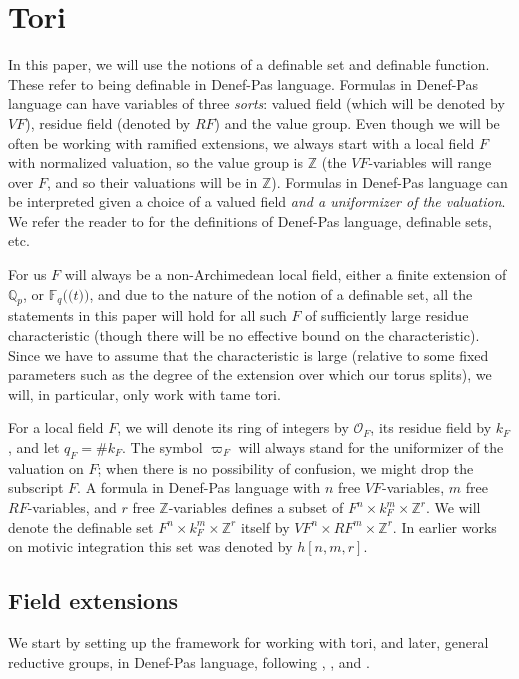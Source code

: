\documentclass{amsart}
\newcommand{\Q}{{\mathbb Q}}
\newcommand{\F}{{\mathbb F}}
\newcommand{\Z}{{\mathbb Z}}
\newcommand{\ri}{\mathcal{O}}
\def\llp{\mathopen{(\!(}}
\def\rrp{\mathopen{)\!)}}
\theoremstyle{plain}
\theoremstyle{definition}
\begin{document}
\section{Tori} 
In this paper, we will use the notions of a definable set and  definable function. These refer to being definable in Denef-Pas language. 
Formulas in Denef-Pas language can have variables of three \emph{sorts}: valued field (which will be denoted by $VF$), residue field (denoted by $RF$) and the value group. Even though we will be often be working with ramified extensions, we always start with a local field $F$ with normalized valuation, so the value group is $\Z$ (the $VF$-variables will range over $F$, and so their valuations will be in $\Z$).
Formulas in Denef-Pas language can be interpreted given a choice of a valued field \emph{and a uniformizer of the valuation}. 
We refer the reader to \cite{what's the best ref?} for the definitions of Denef-Pas language, definable sets, etc. 

For us $F$ will always be a non-Archimedean local field, either a finite extension of $\Q_p$, or 
$\F_q\llp t\rrp$, and due to the nature of the notion of a definable set,  all the statements in this paper will hold for all such $F$ of sufficiently large residue characteristic 
(though there will be no effective bound on the characteristic). Since we have to assume that the characteristic is large (relative to some fixed parameters such as the degree of the extension over which our torus splits), we will, in particular, only work with tame tori.  

For a local field $F$, we will denote its ring of integers by $\ri_F$,  its residue field by $k_F$, and let $q_F=\# k_F$. The symbol $\varpi_F$ will always stand for the uniformizer of the valuation on $F$; when there is no possibility of confusion, we might drop the subscript $F$. 
A formula in Denef-Pas language  with $n$ free $VF$-variables, $m$ free $RF$-variables, and $r$ free 
$\Z$-variables 
defines a subset of $F^n\times k_F^m \times \Z^r$. 
We will denote the definable set $F^n\times k_F^m \times \Z^r$ itself by $VF^n\times RF^m\times \Z^r$. In earlier works on motivic integration this set was denoted by $h[n,m,r]$. 


\subsection{Field extensions}
We start by setting up the framework for working with tori, and later, general reductive groups, in Denef-Pas language, following \cite{cluckers-hales-loeser}, \cite{CGH-2}, and \cite{hales:transfert}. 
\end{document}
